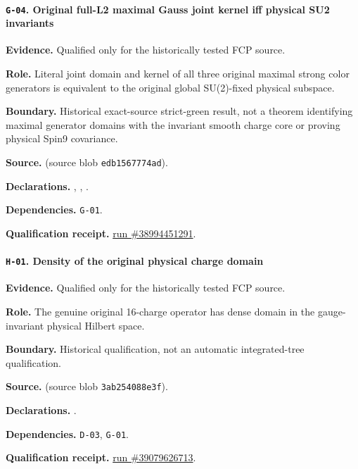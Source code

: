 \paragraph{\texttt{G-04}. Original full-L2 maximal Gauss joint kernel iff physical SU2 invariants}
\noindent\textbf{Evidence.} Qualified only for the historically tested FCP source.
\par\noindent\textbf{Role.} Literal joint domain and kernel of all three original maximal strong color generators is equivalent to the original global SU(2)-fixed physical subspace.
\par\noindent\textbf{Boundary.} Historical exact-source strict-green result, not a theorem identifying maximal generator domains with the invariant smooth charge core or proving physical Spin9 covariance.
\par\noindent\textbf{Source.}  (source blob \texttt{edb1567774ad}).
\par\noindent\textbf{Declarations.} , , .
\par\noindent\textbf{Dependencies.} \texttt{G-01}.
\par\noindent\textbf{Qualification receipt.} \href{https://github.com/etblink/Foundational-Convergence-Program/actions/runs/38994451291}{run \#38994451291}.
\medskip

\paragraph{\texttt{H-01}. Density of the original physical charge domain}
\noindent\textbf{Evidence.} Qualified only for the historically tested FCP source.
\par\noindent\textbf{Role.} The genuine original 16-charge operator has dense domain in the gauge-invariant physical Hilbert space.
\par\noindent\textbf{Boundary.} Historical qualification, not an automatic integrated-tree qualification.
\par\noindent\textbf{Source.}  (source blob \texttt{3ab254088e3f}).
\par\noindent\textbf{Declarations.} .
\par\noindent\textbf{Dependencies.} \texttt{D-03}, \texttt{G-01}.
\par\noindent\textbf{Qualification receipt.} \href{https://github.com/etblink/Foundational-Convergence-Program/actions/runs/39079626713}{run \#39079626713}.
\medskip

